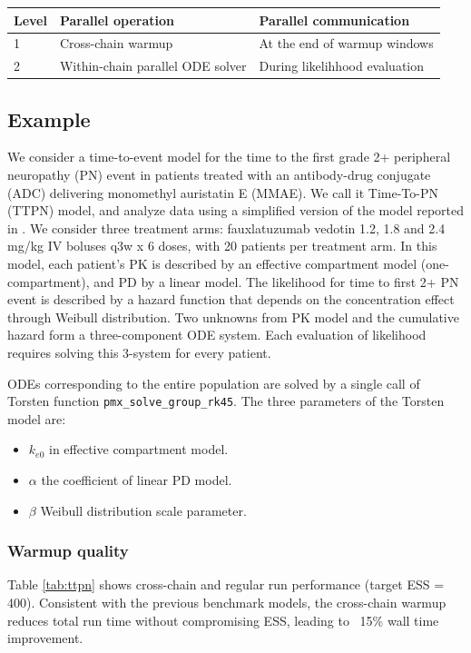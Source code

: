 \documentclass[landscape,a0paper,fontscale=0.45]{baposter} %
\begin{document}
\begin{poster}
{\begin{multicols}{2}
\begin{center}
\begin{tabular}{l l l}
\hline
Level & Parallel operation & Parallel communication \\
\hline
1 & Cross-chain warmup & At the end of warmup windows \\
2 & Within-chain parallel ODE solver & During likelihhood evaluation \\
\hline
\end{tabular}
\end{center}

\subsection*{Example}
We consider a time-to-event model for the time to the first grade 2+ peripheral neuropathy (PN)
event in patients treated with an antibody-drug conjugate (ADC)
delivering monomethyl auristatin E (MMAE). We call it
Time-To-PN (TTPN) model, and analyze data using a
simplified version of the model reported in
\cite{lu_time--event_2017}. We consider three treatment arms:
fauxlatuzumab vedotin 1.2, 1.8 and 2.4 mg/kg IV boluses q3w x 6 doses,
with 20 patients per treatment arm. In this model,
each patient's PK is described by an effective compartment model (one-compartment),
and PD by a linear model. The likelihood for time to first 2+ PN event
is described by a hazard function that depends on the concentration
effect through Weibull distribution. Two unknowns from
PK model and the cumulative hazard form a three-component
ODE system. Each evaluation of likelihood requires solving this
3-system for every patient. 

ODEs corresponding to the entire
population are solved by a single call of Torsten function \texttt{\texttt{pmx\_solve\_group\_rk45}}. The three parameters of the
Torsten model are:
\begin{itemize}
\item \(k_{e0}\) in effective compartment model.
\item \(\alpha\) the coefficient of linear PD model.
\item \(\beta\) Weibull distribution scale parameter.
\end{itemize}

\subsubsection*{Warmup quality}
Table \ref{tab:ttpn} shows cross-chain and
regular run performance (target ESS = 400). Consistent with the
previous benchmark models, the cross-chain warmup reduces total run time without
compromising ESS, leading to ~15\% wall time improvement.


\end{multicols}}
\end{poster}
\end{document}
